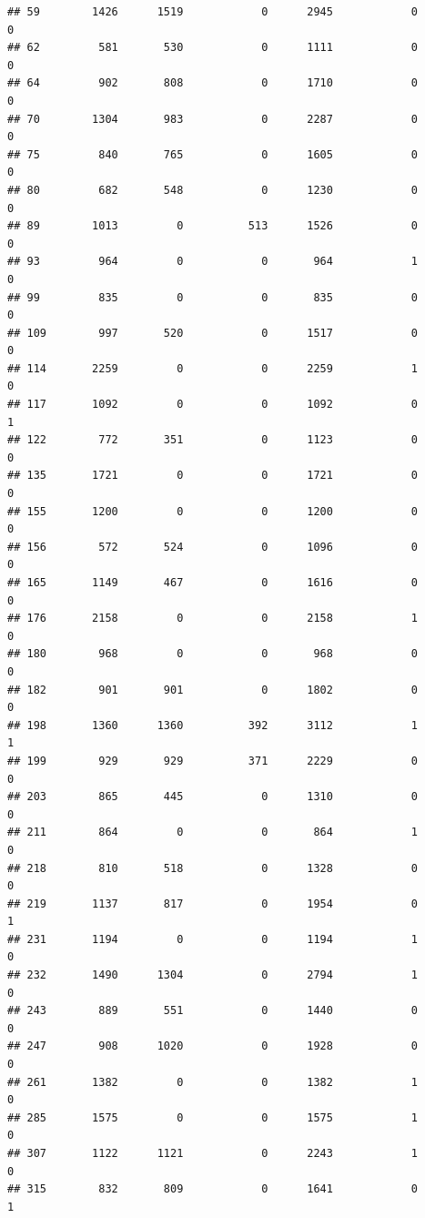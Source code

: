 \documentclass[]{article}
\begin{document}
\begin{verbatim}
## 59        1426      1519            0      2945            0            0
## 62         581       530            0      1111            0            0
## 64         902       808            0      1710            0            0
## 70        1304       983            0      2287            0            0
## 75         840       765            0      1605            0            0
## 80         682       548            0      1230            0            0
## 89        1013         0          513      1526            0            0
## 93         964         0            0       964            1            0
## 99         835         0            0       835            0            0
## 109        997       520            0      1517            0            0
## 114       2259         0            0      2259            1            0
## 117       1092         0            0      1092            0            1
## 122        772       351            0      1123            0            0
## 135       1721         0            0      1721            0            0
## 155       1200         0            0      1200            0            0
## 156        572       524            0      1096            0            0
## 165       1149       467            0      1616            0            0
## 176       2158         0            0      2158            1            0
## 180        968         0            0       968            0            0
## 182        901       901            0      1802            0            0
## 198       1360      1360          392      3112            1            1
## 199        929       929          371      2229            0            0
## 203        865       445            0      1310            0            0
## 211        864         0            0       864            1            0
## 218        810       518            0      1328            0            0
## 219       1137       817            0      1954            0            1
## 231       1194         0            0      1194            1            0
## 232       1490      1304            0      2794            1            0
## 243        889       551            0      1440            0            0
## 247        908      1020            0      1928            0            0
## 261       1382         0            0      1382            1            0
## 285       1575         0            0      1575            1            0
## 307       1122      1121            0      2243            1            0
## 315        832       809            0      1641            0            1

\end{verbatim}
\end{document}
